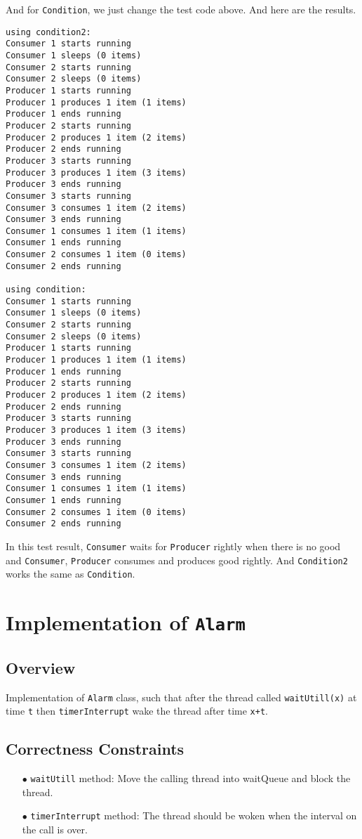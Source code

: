 \documentclass{article}
\begin{document}
And for \texttt{Condition}, we just change the test code above. And here are the results.
\begin{lstlisting}
using condition2:
Consumer 1 starts running
Consumer 1 sleeps (0 items)
Consumer 2 starts running
Consumer 2 sleeps (0 items)
Producer 1 starts running
Producer 1 produces 1 item (1 items)
Producer 1 ends running
Producer 2 starts running
Producer 2 produces 1 item (2 items)
Producer 2 ends running
Producer 3 starts running
Producer 3 produces 1 item (3 items)
Producer 3 ends running
Consumer 3 starts running
Consumer 3 consumes 1 item (2 items)
Consumer 3 ends running
Consumer 1 consumes 1 item (1 items)
Consumer 1 ends running
Consumer 2 consumes 1 item (0 items)
Consumer 2 ends running

using condition:
Consumer 1 starts running
Consumer 1 sleeps (0 items)
Consumer 2 starts running
Consumer 2 sleeps (0 items)
Producer 1 starts running
Producer 1 produces 1 item (1 items)
Producer 1 ends running
Producer 2 starts running
Producer 2 produces 1 item (2 items)
Producer 2 ends running
Producer 3 starts running
Producer 3 produces 1 item (3 items)
Producer 3 ends running
Consumer 3 starts running
Consumer 3 consumes 1 item (2 items)
Consumer 3 ends running
Consumer 1 consumes 1 item (1 items)
Consumer 1 ends running
Consumer 2 consumes 1 item (0 items)
Consumer 2 ends running
\end{lstlisting}
In this test result, \texttt{Consumer} waits for \texttt{Producer} rightly when there is no good and \texttt{Consumer}, \texttt{Producer} consumes and produces good rightly. And \texttt{Condition2} works the same as \texttt{Condition}.
\section{Implementation of \texttt{Alarm}}
\subsection{Overview}
Implementation of \texttt{Alarm} class, such that after the thread called \texttt{waitUtill(x)} at time \texttt{t} then \texttt{timerInterrupt} 
wake the thread after time \texttt{x+t}.
\subsection{Correctness Constraints}
\begin{enumerate}
	\item[$\bullet$] \texttt{waitUtill} method: Move the calling thread into waitQueue and block the thread. 
	\item[$\bullet$] \texttt{timerInterrupt} method: The thread should be woken when the interval on the call is over.
\end{enumerate}
\end{document}

